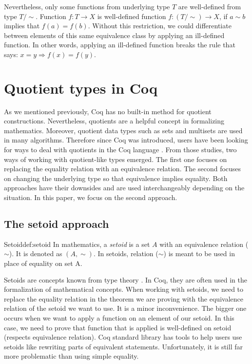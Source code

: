 Nevertheless, only some functions from underlying type $T$ are well-defined from type $T/\sim$. Function $f : T \rightarrow X$ is well-defined function $f : (T/\sim) \rightarrow X$, if $a \sim b$ implies that $f(a) = f(b)$. Without this restriction, we could differentiate between elements of this same equivalence class by applying an ill-defined function. In other words, applying an ill-defined function breaks the rule that says: $x = y \Rightarrow f(x) = f(y)$.

\section{Quotient types in Coq}
As we mentioned previously, Coq has no built-in method for quotient constructions. Nevertheless, quotients are a helpful concept in formalizing mathematics. Moreover, quotient data types such as sets and multisets are used in many algorithms. Therefore since Coq was introduced, users have been looking for ways to deal with quotients in the Coq language \cite{cicQuotient} \cite{PragmaticQT} \cite{NormalizedTypes}. From those studies, two ways of working with quotient-like types emerged. The first one focuses on replacing the equality relation with an equivalence relation. The second focuses on changing the underlying type so that equivalence implies equality. Both approaches have their downsides and are used interchangeably depending on the situation. In this paper, we focus on the second approach.

\subsection{The setoid approach}
\begin{defi}{Setoid}{def:setoid}
In mathematics, a \emph{setoid} is a set $A$ with an equivalence relation ($\sim$). It is denoted as $(A, \sim)$. In setoids, relation ($\sim$) is meant to be used in place of equality on set A.
\end{defi}
Setoids are concepts known from type theory \cite{SetoidsInTT} \cite{Setoids2}. In Coq, they are often used in the formalization of mathematical concepts. When working with setoids, we need to replace the equality relation in the theorem we are proving with the equivalence relation of the setoid we want to use. It is a minor inconvenience. The bigger one occurs when we want to apply a function on an element of our setoid. In this case, we need to prove that function that is applied is well-defined on setoid (respects equivalence relation). Coq standard library has tools to help users use setoids like rewriting parts of equivalent statements. Unfortunately, it is still far more problematic than using simple equality.

